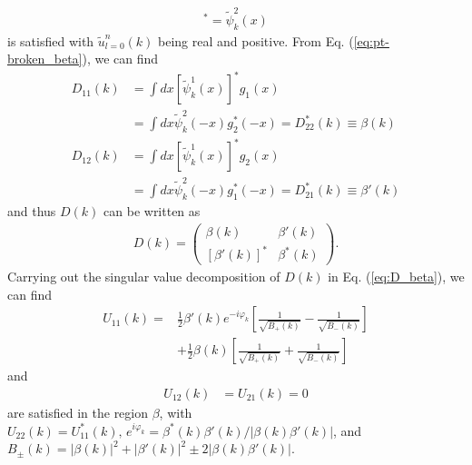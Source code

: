 \documentclass[prb,superscriptaddress,floatfix,twocolumn,showpacs]{revtex4-2}
\begin{document}
\begin{align}
    [\tilde{\psi}_k^1(-x)]^\ast=\tilde{\psi}_k^2(x)
    \label{eq:pt-broken_beta}
\end{align}
is satisfied with $\tilde{u}_{l=0}^n(k)$ being real and positive. 
From Eq. (\ref{eq:pt-broken_beta}), we can find 
\begin{align}
    D_{11}(k)&=\int dx[\tilde{\psi}_k^1(x)]^\ast g_1(x)\nonumber\\
    &=\int dx\tilde{\psi}_k^2(-x)g_2^\ast(-x)=D_{22}^\ast(k)\equiv\beta(k)
    \label{eq:relation_D_beta_1}\\
    D_{12}(k)&=\int dx[\tilde{\psi}_k^1(x)]^\ast g_2(x)\nonumber\\
    &=\int dx\tilde{\psi}_k^2(-x)g_1^\ast(-x)=D_{21}^\ast(k)\equiv\beta'(k) \label{eq:relation_D_beta_2}
\end{align}
and thus $D(k)$ can be written as
\begin{align}
    D(k)=\begin{pmatrix}
    \beta(k)&\beta'(k)\\
    [\beta'(k)]^\ast&\beta^\ast(k)
    \end{pmatrix}.
    \label{eq:D_beta}
\end{align}
Carrying out the singular value decomposition of $D(k)$ in Eq. (\ref{eq:D_beta}), we can find
\begin{align}
    U_{11}(k)=&\frac{1}{2}\beta'(k)e^{-i\varphi_k}
    \left[\frac{1}{\sqrt{B_+(k)}}-\frac{1}{\sqrt{B_-(k)}}\right]\nonumber\\
    &+\frac{1}{2}\beta(k)\left[\frac{1}{\sqrt{B_+(k)}}+\frac{1}{\sqrt{B_-(k)}}\right]
    \label{eq:U11_beta}
\end{align}
and
\begin{align}
    U_{12}(k)&=U_{21}(k)=0
    \label{eq:U12_beta}
\end{align}
are satisfied in the region $\beta$, with  $U_{22}(k)=U_{11}^\ast(k),\,e^{i\varphi_k}=\beta^\ast(k)\beta'(k)/|\beta(k)\beta'(k)|$, and $B_\pm(k)=|\beta(k)|^2+|\beta'(k)|^2\pm2|\beta(k)\beta'(k)|$.
\end{document}
